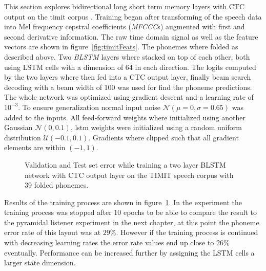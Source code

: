 This section explores bidirectional long short term memory layers with CTC output on the timit corpus \cite{Graves2012, Graves2006}. Training began after transforming of the speech data into Mel frequency cepstral coefficients (\textit{MFCCC}s) augmented with first and second derivative information. The raw time domain signal as well as the feature vectors are shown in figure~\ref{fig:timitFeats}. The phonemes where folded as described above. Two \textit{BLSTM} layers where stacked on top of each other, both using LSTM cells with a dimension of 64 in each direction. The logits computed by the two layers where then fed into a CTC output layer, finally beam search decoding with a beam width of 100 was used for find the phoneme predictions. The whole network was optimized using gradient descent and a learning rate of $10^{-3}$. To ensure generalization normal input noise $\mathcal{N}(\mu = 0,\sigma = 0.65)$ was added to the inputs. All feed-forward weights where initialized using another Gaussian $\mathcal{N}(0, 0.1)$, lstm weights were initialized using a random uniform distribution $\mathcal{U}(-0.1, 0.1)$. Gradients where clipped such that all gradient elements are within $(-1,1)$.
\begin{figure}
\centering


\caption{Validation and Test set error while training a two layer BLSTM network with CTC output layer on the TIMIT speech corpus with 39 folded phonemes.}
\label{fig:ctc2BLSTM41}
\end{figure}
Results of the training process are shown in figure~\ref*{fig:ctc2BLSTM41}. In the experiment the training process was stopped after 10 epochs to be able to compare the result to the pyramidal listener experiment in the next chapter, at this point the phoneme error rate of this layout was at $29\%$. However if the training process is continued with decreasing learning rates the error rate values end up close to $26\%$ eventually. Performance can be increased further by assigning the LSTM cells a larger state dimension.











